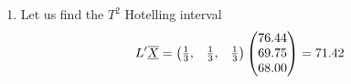 \documentclass[11pt,a4paper]{article}
\theoremstyle{definition}
\begin{document}
\begin{enumerate}
$$\frac{p(n-1)}{n-p}F_{3,33}(0.95) = \frac{3\times 35}{33}\times 2.88= 9.164$$\\



$$\overline{\underline{X}}-\underline{\mu} = \begin{pmatrix}
76.44 - \mu_1\\
69.75 - \mu_2\\
68.06 - \mu_3\\
\end{pmatrix} $$\\



$$36
\begin{pmatrix}
76.44 - \mu_1\\
69.75 - \mu_2\\
68.06 - \mu_3\\
\end{pmatrix}'
\begin{pmatrix}
0.0183304 &  & \\
0.0002359 & 0.002401 & \\
0.0015441 & 0.004646 & 0.06989\\
\end{pmatrix}
\begin{pmatrix}
76.44 - \mu_1\\
69.75 - \mu_2\\
68.06 - \mu_3\\
\end{pmatrix} 
\leq 9.164
$$ 
expanding may give the general formula $$a\mu^2_1 + b \mu^2_2 + c\mu^2_3 + d\mu_1\mu_2 + e\mu_1\mu_3 + f\mu_2\mu_3 + g \leq 9.164$$\\

\item Let us find the $T^2$ Hotelling interval
$$L'\overline{\underline{X}} = \begin{pmatrix}
\frac{1}{3}, & \frac{1}{3}, & \frac{1}{3}\\
\end{pmatrix}
\begin{pmatrix}
76.44\\ 69.75\\ 68.00\\
\end{pmatrix}
= 71.42\\
$$



\end{enumerate}
\end{document}
